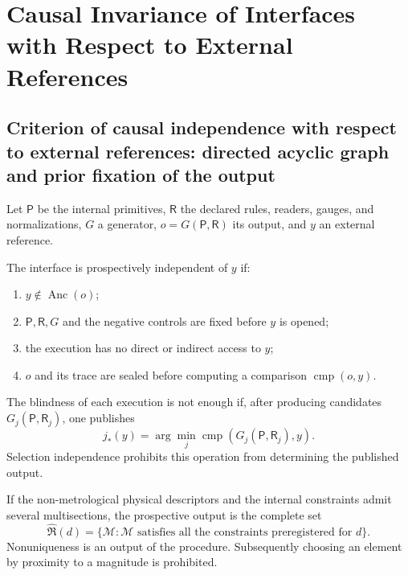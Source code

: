 \chapter{Causal Invariance of Interfaces with Respect to External References}
\label{chap:independencia-prospectiva}

\section{Criterion of causal independence with respect to external references: directed acyclic graph and prior fixation of the output}
\label{sec:definiciones-independencia-prospectiva}

Let \(\mathsf P\) be the internal primitives, \(\mathsf R\) the declared rules,
readers, gauges, and normalizations, \(G\) a generator,
\(o=G(\mathsf P,\mathsf R)\) its output, and \(y\) an external reference.

\begin{definition}
\label{def:interfaz-prospectivamente-independiente}
The interface is prospectively independent of \(y\) if:
\begin{enumerate}
 \item \(y\notin\operatorname{Anc}(o)\);
 \item \(\mathsf P,\mathsf R,G\) and the negative controls are fixed before
 \(y\) is opened;
 \item the execution has no direct or indirect access to \(y\);
 \item \(o\) and its trace are sealed before computing a comparison
 \(\operatorname{cmp}(o,y)\).
\end{enumerate}
\end{definition}

\begin{definition}
\label{def:independencia-seleccion}
The blindness of each execution is not enough if, after producing candidates
\(G_j(\mathsf P,\mathsf R_j)\), one publishes
\[
 j_\ast(y)=\arg\min_j
 \operatorname{cmp}\!\left(G_j(\mathsf P,\mathsf R_j),y\right).
\]
Selection independence prohibits this operation from determining the published output.
\end{definition}

\begin{definition}
\label{def:prediccion-multivaluada}
If the non-metrological physical descriptors and the internal constraints
admit several multisections, the prospective output is the complete set
\[
 \widehat{\mathfrak R}(d)
 =\{\mathcal M:\mathcal M\text{ satisfies all the constraints
 preregistered for }d\}.
\]
Nonuniqueness is an output of the procedure. Subsequently choosing an element
by proximity to a magnitude is prohibited.
\end{definition}

